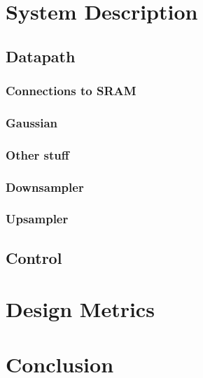 \documentclass[11pt]{article}
\begin{document}
\section{System Description}

\subsection{Datapath}

\subsubsection{Connections to SRAM}

\subsubsection{Gaussian}

\subsubsection{Other stuff}

\subsubsection{Downsampler}

\subsubsection{Upsampler}

\subsection{Control}

\section{Design Metrics}

\section{Conclusion}
\end{document}
